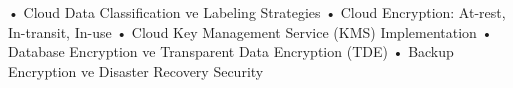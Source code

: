• Cloud Data Classification ve Labeling Strategies
• Cloud Encryption: At-rest, In-transit, In-use
• Cloud Key Management Service (KMS) Implementation
• Database Encryption ve Transparent Data Encryption (TDE)
• Backup Encryption ve Disaster Recovery Security